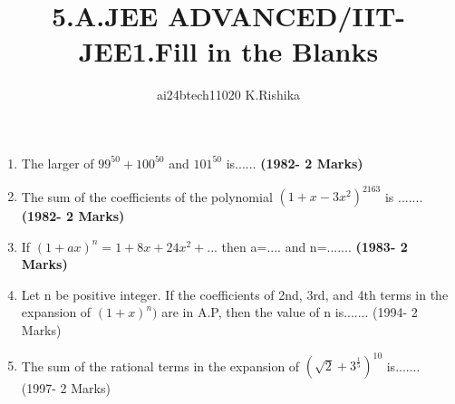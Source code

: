 \documentclass[journal,12pt,twocolumn]{IEEEtran}
\theoremstyle{remark}
\begin{document}

\vspace{3cm}

\title{5.A.JEE ADVANCED/IIT-JEE1.Fill in the Blanks}
\author{ai24btech11020 K.Rishika}

\maketitle
\bigskip   
\renewcommand{\thefigure}{\theenumi}
\renewcommand{\thetable}{\theenumi}     
\begin{enumerate}[start=1]
\item The larger of $99^{50}+100^{50}$ and $101^{50}$ is......
	\hfill\textbf{(1982- 2 Marks)}\\
\item The sum of the coefficients of the polynomial $(1+x-3x^2)^2163$ is .......
	\hfill\textbf{(1982- 2 Marks)}\\
\item If $(1+ax)^n=1+8x+24x^2+...$ then a=.... and n=.......
	\hfill\textbf{(1983- 2 Marks)}\\
\item Let n be positive integer. If the coefficients of 2nd, 3rd, and 4th terms in the expansion of $(1 + x)^n)$ are in A.P, then the value of n is.......
	\hfill{(1994- 2 Marks)}\\
\item The sum of the rational terms in the expansion of $(\sqrt{2}+3^\frac{1}{5})^{10}$ is.......
	\hfill{(1997- 2 Marks)}
\end{enumerate}
\end{document}

